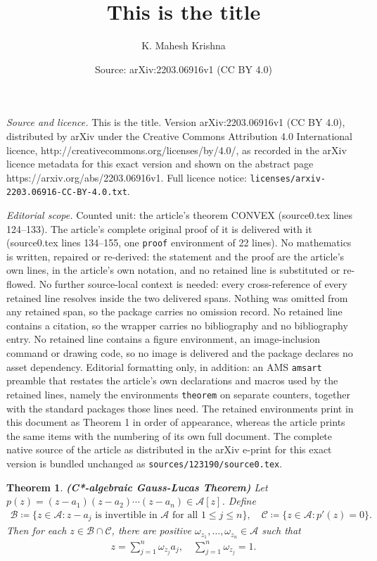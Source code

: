 \documentclass[10pt,a4paper]{amsart}
\title{This is the title}
\author{K. Mahesh Krishna}
\date{Source: arXiv:2203.06916v1 (CC BY 4.0)}
\newtheorem{theorem}{Theorem}
\begin{document}
\maketitle

\noindent\emph{Source and licence.} This is the title. Version arXiv:2203.06916v1 (CC BY 4.0), distributed by arXiv under the Creative Commons Attribution 4.0 International licence, http://creativecommons.org/licenses/by/4.0/, as recorded in the arXiv licence metadata for this exact version and shown on the abstract page https://arxiv.org/abs/2203.06916v1. Full licence notice: \texttt{licenses/arxiv-2203.06916-CC-BY-4.0.txt}.\par\smallskip

\noindent\textit{Editorial scope.} Counted unit: the article's theorem CONVEX (source0.tex lines 124--133). The article's complete original proof of it is delivered with it (source0.tex lines 134--155, one \texttt{proof} environment of 22 lines). No mathematics is written, repaired or re-derived: the statement and the proof are the article's own lines, in the article's own notation, and no retained line is substituted or re-flowed.  No further source-local context is needed: every cross-reference of every retained line resolves inside the two delivered spans.  Nothing was omitted from any retained span, so the package carries no omission record.  No retained line contains a citation, so the wrapper carries no bibliography and no bibliography entry.  No retained line contains a figure environment, an image-inclusion command or drawing code, so no image is delivered and the package declares no asset dependency.  Editorial formatting only, in addition: an AMS \texttt{amsart} preamble that restates the article's own declarations and macros used by the retained lines, namely the environments \texttt{theorem} on separate counters, together with the standard packages those lines need.  The retained environments print in this document as Theorem 1 in order of appearance, whereas the article prints the same items with the numbering of its own full document.  The complete native source of the article as distributed in the arXiv e-print for this exact version is bundled unchanged as \texttt{sources/123190/source0.tex}.
\begin{theorem}
\textbf{(C*-algebraic Gauss-Lucas Theorem)} Let $p(z)=(z-a_1)(z-a_2)\cdots (z-a_n)\in\mathcal{A}[z]$. 	Define 
\begin{align*}
	\mathcal{B}\coloneqq \{z \in \mathcal{A}: z-a_j \text{ is  invertible in }  \mathcal{A} \text{ for all } 1\leq j \leq n\}, \quad 	\mathcal{C}\coloneqq \{z \in \mathcal{A}: p'(z)=0\}.	
\end{align*}
 Then for each $z \in \mathcal{B}\cap  \mathcal{C}$, there are positive $\omega_{z_1}, \dots, \omega_{z_n} \in  \mathcal{A}$ such that 
\begin{align}\label{CONVEX}
	z=\sum_{j=1}^{n}\omega_{z_j}a_j, \quad \sum_{j=1}^{n}\omega_{z_j}=1.
\end{align}
\end{theorem}
\end{document}
